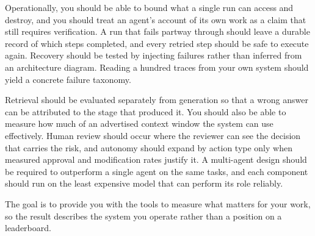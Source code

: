 Operationally, you should be able to bound what a single run can access and destroy, and you should treat an agent's account of its own work as a claim that still requires verification. A run that fails partway through should leave a durable record of which steps completed, and every retried step should be safe to execute again. Recovery should be tested by injecting failures rather than inferred from an architecture diagram. Reading a hundred traces from your own system should yield a concrete failure taxonomy.

Retrieval should be evaluated separately from generation so that a wrong answer can be attributed to the stage that produced it. You should also be able to measure how much of an advertised context window the system can use effectively. Human review should occur where the reviewer can see the decision that carries the risk, and autonomy should expand by action type only when measured approval and modification rates justify it. A multi-agent design should be required to outperform a single agent on the same tasks, and each component should run on the least expensive model that can perform its role reliably.

The goal is to provide you with the tools to measure what matters for your work, so the result describes the system you operate rather than a position on a leaderboard.
